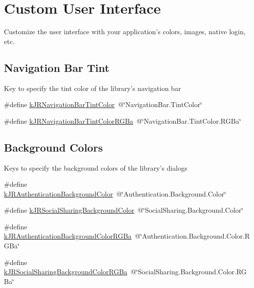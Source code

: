 \hypertarget{group__custom_interface}{
\section{Custom User Interface}
\label{group__custom_interface}
}


Customize the user interface with your application's colors, images, native login, etc.  


\subsection*{Navigation Bar Tint}
\label{_amgrpcbb064fcefe41751c8f91866832360e5}
 Key to specify the tint color of the library's navigation bar \begin{DoxyCompactItemize}
\item 
\#define \hyperlink{group__custom_interface_ga7c7ed7dac155537c9bc14531c5cec3cb}{kJRNavigationBarTintColor}~@\char`\"{}NavigationBar.TintColor\char`\"{}
\item 
\#define \hyperlink{group__custom_interface_gabda4f66c5cde44bbeaa6a993f4793ac5}{kJRNavigationBarTintColorRGBa}~@\char`\"{}NavigationBar.TintColor.RGBa\char`\"{}
\end{DoxyCompactItemize}
\subsection*{Background Colors}
\label{_amgrpdc55f9575e9d43d9a94ff15dba82dbbc}
 Keys to specify the background colors of the library's dialogs \begin{DoxyCompactItemize}
\item 
\#define \hyperlink{group__custom_interface_gacfe014997457d27386eff69eb731ce0f}{kJRAuthenticationBackgroundColor}~@\char`\"{}Authentication.Background.Color\char`\"{}
\item 
\#define \hyperlink{group__custom_interface_ga404751db179428ee64bbe2fda663efa6}{kJRSocialSharingBackgroundColor}~@\char`\"{}SocialSharing.Background.Color\char`\"{}
\item 
\#define \hyperlink{group__custom_interface_gae0c84a976949aa4eccecc123786efb3c}{kJRAuthenticationBackgroundColorRGBa}~@\char`\"{}Authentication.Background.Color.RGBa\char`\"{}
\item 
\#define \hyperlink{group__custom_interface_ga6554a101f0e2e9474a77262143dc528b}{kJRSocialSharingBackgroundColorRGBa}~@\char`\"{}SocialSharing.Background.Color.RGBa\char`\"{}
\end{DoxyCompactItemize}
